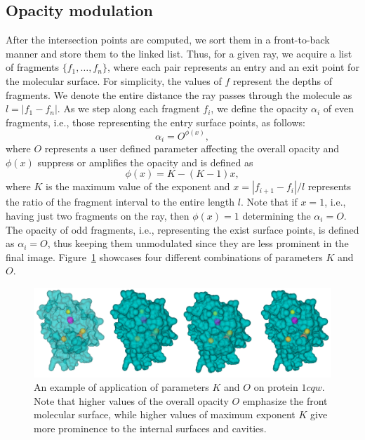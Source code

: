 \subsection{Opacity modulation}
After the intersection points are computed, we sort them in a front-to-back manner and store them to the linked list. 
Thus, for a given ray, we acquire a list of fragments $\{f_1,\ldots,f_n \}$, where each pair represents an entry and an exit point for the molecular surface. For simplicity, the values of $f$ represent the depths of fragments. 
We denote the entire distance the ray passes through the molecule as $l=|f_1-f_n|$. 
As we step along each fragment $f_i$, we define the opacity $\alpha_i$ of even fragments, i.e., those representing the entry surface points, as follows:
\begin{equation}
  \alpha_i = O^{\phi(x)},
	\label{eq:alphaDistEven}
\end{equation}	
where $O$ represents a user defined parameter affecting the overall opacity and $\phi(x)$ suppress or amplifies the opacity and is defined as
\begin{equation}
  \phi(x) = K-(K-1)x,
	\label{eq:exponent}
\end{equation}	
where $K$ is the maximum value of the exponent and $x=|f_{i+1}-f_i|/l$ represents the ratio of the fragment interval to the entire length $l$. Note that if $x=1$, i.e., having just two fragments on the ray, then $\phi(x)=1$ determining the $\alpha_i=O$. The opacity of odd fragments, i.e., representing the exist surface points, is defined as $\alpha_i = O$, thus keeping them unmodulated since they are less prominent in the final image.
Figure~\ref{fig:Oparam} showcases four different combinations of parameters $K$ and $O$.
\begin{figure}[htb]
  \centering
  \includegraphics[width=\textwidth]{image/Oparam.png}
  \caption{An example of application of parameters $K$ and $O$ on protein $1cqw$. Note that higher values of the overall opacity $O$ emphasize the front molecular surface, while higher values of maximum exponent $K$ give more prominence to the internal surfaces and cavities.}
	\label{fig:Oparam}
\end{figure}
